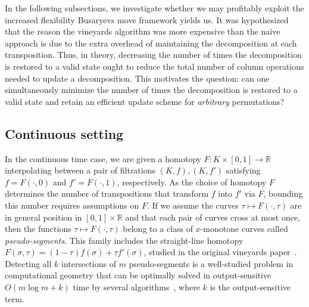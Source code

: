 \documentclass[sn-mathphys]{sn-jnl}
\begin{document}
In the following subsections, we investigate whether we may profitably exploit the increased flexibility Busaryevs move framework yields us.
It was hypothesized that the reason the vineyards algorithm was more expensive than the naïve approach is due to the extra overhead of maintaining the decomposition at each transposition.
Thus, in theory, decreasing the number of times the decomposition is restored to a valid state ought to reduce the total number of column operations needed to update a decomposition. This motivates the question: can one simultaneously minimize the number of times the decomposition is restored to a valid state and retain an efficient update scheme for \emph{arbitrary} permutations? 

\subsection{Continuous setting}\label{sec:continuous_setting}
In the continuous time case, we are given a homotopy $F : K \times [0,1] \to \mathbb{R}$ interpolating between  a pair of filtrations $(K, f), (K,f')$ satisfying $f = F(\cdot, 0)$ and $f' = F(\cdot, 1)$, respectively. 
As the choice of homotopy $F$ determines the number of transpositions that transform $f$ into $f'$ via $F$, bounding this number requires assumptions on $F$. 
If we assume the curves $\tau \mapsto F(\cdot, \tau)$ are in general position in $[0,1]\times \mathbb{R}$ and that each pair of curves cross  at most once, then the  functions $\tau\mapsto F(\cdot, \tau)$ belong to a class of $x$-monotone curves called \emph{pseudo-segments}.
This family includes the straight-line homotopy $F(\sigma, \tau) = (1 - \tau) f(\sigma) + \tau f'(\sigma)$,  studied in the original vineyards paper~\cite{cohen2006vines}. 
Detecting all $k$ intersections of $m$ pseudo-segments is a well-studied problem in computational geometry that can be optimally solved in output-sensitive $O(m \log m + k)$ time by several algorithms~\cite{boissonnat2000efficient}, where $k$ is the output-sensitive term. 
\end{document}
